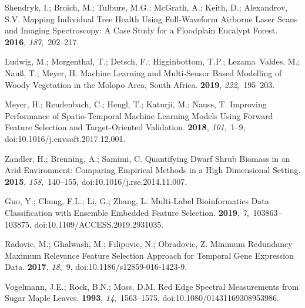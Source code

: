 \documentclass[remotesensing,article,accept,moreauthors,pdftex]{Definitions/mdpi}
\begin{document}
\begin{thebibliography}{999}
Shendryk, I.; Broich, M.; Tulbure, M.G.; McGrath, A.; Keith, D.; Alexandrov,
  S.V.
\newblock Mapping Individual Tree Health Using Full-Waveform Airborne Laser
  Scans and Imaging Spectroscopy: A Case Study for a Floodplain Eucalypt
  Forest.
 {\bf 2016}, {\em 187},~202--217.

Ludwig, M.; Morgenthal, T.; Detsch, F.; Higginbottom, T.P.; Lezama~Valdes, M.;
  Nau{\ss}, T.; Meyer, H.
\newblock Machine Learning and Multi-Sensor Based Modelling of Woody Vegetation
  in the {{Molopo Area}}, {{South Africa}}.
 {\bf 2019}, {\em 222},~195--203.

Meyer, H.; Reudenbach, C.; Hengl, T.; Katurji, M.; Nauss, T.
\newblock Improving Performance of Spatio-Temporal Machine Learning Models
  Using Forward Feature Selection and Target-Oriented Validation.
 {\bf 2018}, {\em
  101},~1--9, doi:10.1016/j.envsoft.2017.12.001.

Zandler, H.; Brenning, A.; Samimi, C.
\newblock Quantifying Dwarf Shrub Biomass in an Arid Environment: Comparing
  Empirical Methods in a High Dimensional Setting.
 {\bf 2015}, {\em 158},~140--155, doi:10.1016/j.rse.2014.11.007.

Guo, Y.; Chung, F.L.; Li, G.; Zhang, L.
\newblock Multi-{{Label Bioinformatics Data Classification with Ensemble
  Embedded Feature Selection}}.
 {\bf 2019}, {\em 7},~103863--103875, doi:10.1109/ACCESS.2019.2931035.

Radovic, M.; Ghalwash, M.; Filipovic, N.; Obradovic, Z.
\newblock Minimum Redundancy Maximum Relevance Feature Selection Approach for
  Temporal Gene Expression Data.
 {\bf 2017}, {\em 18},~9, doi:10.1186/s12859-016-1423-9.

Vogelmann, J.E.; Rock, B.N.; Moss, D.M.
\newblock Red Edge Spectral Measurements from Sugar Maple Leaves.
 {\bf 1993}, {\em
  14},~1563--1575, doi:10.1080/01431169308953986.


\end{thebibliography}
\end{document}
